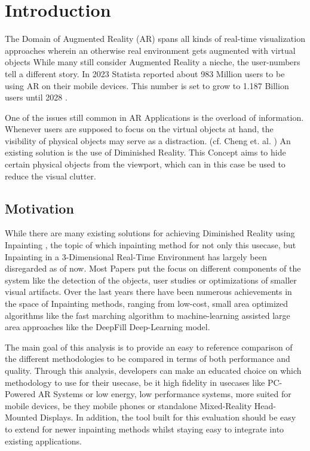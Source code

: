 \chapter{Introduction}
\label{cha:Introduction}

The Domain of Augmented Reality (AR)  spans all kinds of real-time visualization approaches wherein an otherwise real environment gets augmented with virtual objects \cite{Milgram1994}
While many still consider Augmented Reality a nieche, the user-numbers tell a different story. In 2023 Statista reported about 983 Million users to be using AR on their mobile devices. This number is set to grow to 1.187 Billion users until 2028 \cite{Statista2024}.

One of the issues still common in AR Applications is the overload of information. Whenever users are supposed to focus on the virtual objects at hand, the visibility of physical objects may serve as a distraction. (cf. Cheng et. al. \cite{ChengYiFei2022TUDR})
An existing solution is the use of Diminished Reality. This Concept aims to hide certain physical objects from the viewport, which can in this case be used to reduce the visual clutter.

\section{Motivation}

While there are many existing solutions for achieving Diminished Reality using Inpainting , the topic of which inpainting method for not only this usecase, but Inpainting in a 3-Dimensional Real-Time Environment has largely been disregarded as of now. Most Papers put the focus on different components of the system like the detection of the objects, user studies or optimizations of smaller visual artifacts.
Over the last years there have been numerous achievements in the space of Inpainting methods, ranging from low-cost, small area optimized algorithms like the fast marching algorithm \cite{Weiwei2021} to machine-learning assisted large area approaches like the DeepFill Deep-Learning model.\cite{MuziHao2023}

The main goal of this analysis is to provide an easy to reference comparison of the different methodologies to be compared in terms of both performance and quality. Through this analysis, developers can make an educated choice on which methodology to use for their usecase, be it high fidelity in usecases like PC-Powered AR Systems or low energy, low performance systems, more suited for mobile devices, be they mobile phones or standalone Mixed-Reality Head-Mounted Displays.
In addition, the tool built for this evaluation should be easy to extend for newer inpainting methods whilst staying easy to integrate into existing applications.


